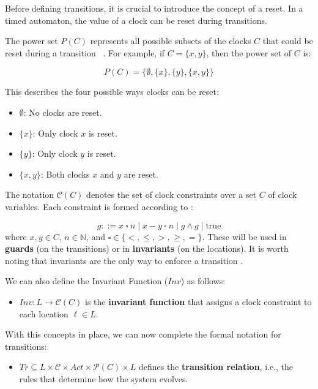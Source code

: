 Before defining transitions, it is crucial to introduce the concept of a reset. In a timed automaton, the value of a clock can be reset during transitions.

The power set \( P(C) \) represents all possible subsets of the clocks \( C \) that could be reset during a transition ~\cite{baukus2002power}. For example, if \( C = \{x, y\} \), then the power set of \( C \) is:

\[
P(C) = \{\emptyset, \{x\}, \{y\}, \{x, y\}\}
\]

This describes the four possible ways clocks can be reset:

\begin{itemize}
    \item \( \emptyset \): No clocks are reset.
    \item \( \{x\} \): Only clock \( x \) is reset.
    \item \( \{y\} \): Only clock \( y \) is reset.
    \item \( \{x, y\} \): Both clocks \( x \) and \( y \) are reset.
\end{itemize} 

The notation \( \mathcal{C}(C) \) denotes the set of clock constraints over a set \( C \) of clock variables. Each constraint is formed according to \cite{baier2008principles}:

\[
g ::= x \ \square \ n \mid x - y \ \square \ n \mid g \land g \mid \text{true}
\]
where \( x, y \in C \), \( n \in \mathbb{N} \), and \( \square \in \{ <, \leq, >, \geq, = \} \). These will be used in \textbf{guards} (on the transitions) or in \textbf{invariants} (on the locations). It is worth noting that invariants are the only way to enforce a transition \cite{baier2008principles}. 

We can also define the Invariant Function ($Inv$) as follows:

\begin{itemize}
    \item $Inv: L \rightarrow \mathcal{C}(C)$ is the \textbf{invariant function} that assigns a clock constraint to each location $\ell \in L$.
\end{itemize}

With this concepts in place, we can now complete the formal notation for transitions:

\begin{itemize}
    \item \( Tr \subseteq L \times \mathcal{C} \times Act \times \mathcal{P}(C) \times L \) defines the \textbf{transition relation}, i.e., the rules that determine how the system evolves.
\end{itemize}


